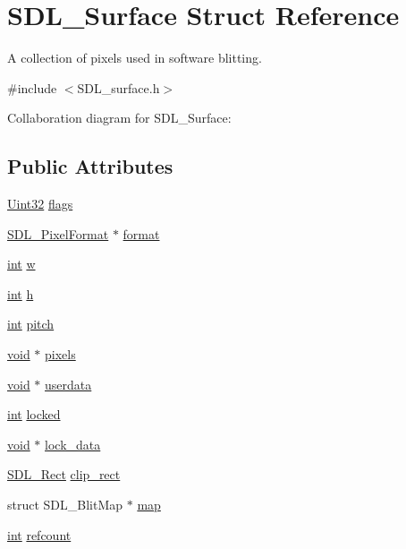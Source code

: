 \hypertarget{struct_s_d_l___surface}{\section{S\-D\-L\-\_\-\-Surface Struct Reference}
\label{struct_s_d_l___surface}
}


A collection of pixels used in software blitting.  




{\ttfamily \#include $<$S\-D\-L\-\_\-surface.\-h$>$}



Collaboration diagram for S\-D\-L\-\_\-\-Surface\-:
\subsection*{Public Attributes}
\begin{DoxyCompactItemize}
\item 
\hyperlink{_s_d_l__stdinc_8h_add440eff171ea5f55cb00c4a9ab8672d}{Uint32} \hyperlink{struct_s_d_l___surface_a86d78b665d5dfd7aa1dd9696b067641b}{flags}
\item 
\hyperlink{struct_s_d_l___pixel_format}{S\-D\-L\-\_\-\-Pixel\-Format} $\ast$ \hyperlink{struct_s_d_l___surface_a0a90721f947c10c3b79e02ccb419ca62}{format}
\item 
\hyperlink{_s_d_l__thread_8h_a6a64f9be4433e4de6e2f2f548cf3c08e}{int} \hyperlink{struct_s_d_l___surface_a9b0ec7185dcdb2a3530a9160a6ea83d9}{w}
\item 
\hyperlink{_s_d_l__thread_8h_a6a64f9be4433e4de6e2f2f548cf3c08e}{int} \hyperlink{struct_s_d_l___surface_af33bcf87a1f5e10a99b3c7e8626b38c8}{h}
\item 
\hyperlink{_s_d_l__thread_8h_a6a64f9be4433e4de6e2f2f548cf3c08e}{int} \hyperlink{struct_s_d_l___surface_a5fa37325d77d65b2ed64ffc7cd01bb6c}{pitch}
\item 
\hyperlink{_s_d_l__opengl_8h_a3db05964a3cc4410f35b7ea2b7eb850d}{void} $\ast$ \hyperlink{struct_s_d_l___surface_abd9597e0e084b8ef33fe0397bc26d911}{pixels}
\item 
\hyperlink{_s_d_l__opengl_8h_a3db05964a3cc4410f35b7ea2b7eb850d}{void} $\ast$ \hyperlink{struct_s_d_l___surface_ae66d973dcb9b57cb34815892e1ee1f31}{userdata}
\item 
\hyperlink{_s_d_l__thread_8h_a6a64f9be4433e4de6e2f2f548cf3c08e}{int} \hyperlink{struct_s_d_l___surface_a5022edaeea1c0a055fa5d6dccba41de2}{locked}
\item 
\hyperlink{_s_d_l__opengl_8h_a3db05964a3cc4410f35b7ea2b7eb850d}{void} $\ast$ \hyperlink{struct_s_d_l___surface_a0afacfb933b54a9af0846a307a6924fb}{lock\-\_\-data}
\item 
\hyperlink{struct_s_d_l___rect}{S\-D\-L\-\_\-\-Rect} \hyperlink{struct_s_d_l___surface_aa9a0da3b38261dad6cf0cc4e3bb5b0c3}{clip\-\_\-rect}
\item 
struct S\-D\-L\-\_\-\-Blit\-Map $\ast$ \hyperlink{struct_s_d_l___surface_a8c1ecad399b0d4f525b1a53b6ee9393f}{map}
\item 
\hyperlink{_s_d_l__thread_8h_a6a64f9be4433e4de6e2f2f548cf3c08e}{int} \hyperlink{struct_s_d_l___surface_a03d10628a359c0674f5ceffd574f1641}{refcount}
\end{DoxyCompactItemize}


